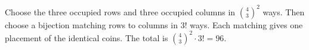 Choose the three occupied rows and three occupied columns in $\binom43^2$ ways. Then choose a bijection matching rows to columns in $3!$ ways. Each matching gives one placement of the identical coins. The total is $\binom43^2\cdot3!=\boxed{96}$.
